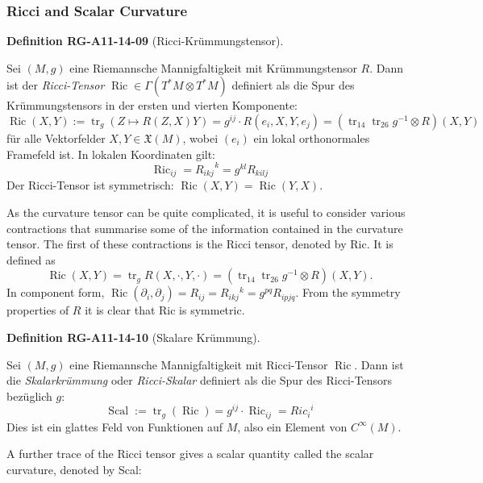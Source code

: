 \documentclass[10pt, letterpaper]{article}
\newcommand{\CustomHeading}[3]{%
  \par\medskip\noindent%
  \textbf{#1 #2} \textnormal{(#3)}.\enskip%
}
\newenvironment{DEF}[2]{\begin{unitbox}\CustomHeading{Definition}{#1}{#2}}{\end{unitbox}}
\begin{document}
\subsubsection*{Ricci and Scalar Curvature}


\begin{DEF}{RG-A11-14-09}{Ricci-Krümmungstensor}
Sei $(M, g)$ eine Riemannsche Mannigfaltigkeit mit Krümmungstensor $R$. Dann ist der \emph{Ricci-Tensor} $\operatorname{Ric} \in \Gamma(T^*M \otimes T^*M)$ definiert als die Spur des Krümmungstensors in der ersten und vierten Komponente:
\[
\operatorname{Ric}(X, Y) := \operatorname{tr}_{g}(Z \mapsto R(Z, X)Y) = g^{ij} \cdot R(e_i, X, Y, e_j) =\left(\operatorname{tr}_{14} \operatorname{tr}_{26} g^{-1} \otimes R\right)(X, Y)
\]
für alle Vektorfelder $X, Y \in \mathfrak{X}(M)$, wobei $(e_i)$ ein lokal orthonormales Framefeld ist. In lokalen Koordinaten gilt:
\[
\operatorname{Ric}_{ij} = R_{ikj}^{\;\;\;\;\;k} = g^{kl} R_{kilj}
\]
Der Ricci-Tensor ist symmetrisch: $\operatorname{Ric}(X,Y) = \operatorname{Ric}(Y,X)$.
\end{DEF}




As the curvature tensor can be quite complicated, it is useful to consider various contractions that summarise some of the information contained in the curvature tensor. The first of these contractions is the Ricci tensor, denoted by Ric. It is defined as
$$
\operatorname{Ric}(X, Y)=\operatorname{tr}_{g} R(X, \cdot, Y, \cdot)=\left(\operatorname{tr}_{14} \operatorname{tr}_{26} g^{-1} \otimes R\right)(X, Y) .
$$
In component form, $\operatorname{Ric}\left(\partial_{i}, \partial_{j}\right)=R_{i j}=R_{i k j}{ }^{k}=g^{p q} R_{i p j q}$. From the symmetry properties of $R$ it is clear that Ric is symmetric.




\begin{DEF}{RG-A11-14-10}{Skalare Krümmung}
Sei $(M, g)$ eine Riemannsche Mannigfaltigkeit mit Ricci-Tensor $\operatorname{Ric}$. Dann ist die \emph{Skalarkrümmung} oder \emph{Ricci-Skalar} definiert als die Spur des Ricci-Tensors bezüglich $g$:
\[
\operatorname{Scal} := \operatorname{tr}_g(\operatorname{Ric}) = g^{ij} \cdot \operatorname{Ric}_{ij}={Ric}_{i}{ }^{i}
\]
Dies ist ein glattes Feld von Funktionen auf $M$, also ein Element von $C^\infty(M)$.
\end{DEF}



A further trace of the Ricci tensor gives a scalar quantity called the scalar curvature, denoted by Scal:
\end{document}
